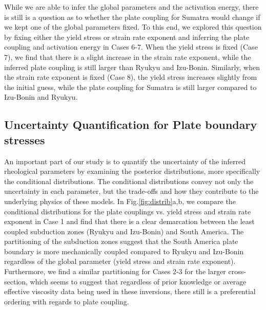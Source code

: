 \documentclass[12pt]{article}
\begin{document}
While we are able to infer the global parameters and the activation energy, there is still is a question as to whether the plate coupling for Sumatra would change if we kept one of the global parameters fixed. To this end, we explored this question by fixing either the yield stress or strain rate exponent and inferring the plate coupling and activation energy in Cases 6-7. When the yield stress is fixed (Case 7), we find that there is a slight increase in the strain rate exponent, while the inferred plate coupling is still larger than Ryukyu and Izu-Bonin. Similarly, when the strain rate exponent is fixed (Case 8), the yield stress increases slightly from the initial guess, while the plate coupling for Sumatra is still larger compared to Izu-Bonin and Ryukyu. 








\subsection{Uncertainty Quantification for Plate boundary stresses}

An important part of our study is to quantify the uncertainty of the inferred rheological parameters by examining the posterior distributions, more specifically the conditional distributions. The conditional distributions convey not only the uncertainty in each parameter, but the trade-offs and how they contribute to the underlying physics of these models. In Fig.\ref{fig:distrib}a,b, we compare the conditional distributions for the plate couplings vs. yield stress and strain rate exponent in Case 1 and find that there is a clear demarcation between the least coupled subduction zones (Ryukyu and Izu-Bonin) and South America. The partitioning of the subduction zones suggest that the South America plate boundary is more mechanically coupled compared to Ryukyu and Izu-Bonin regardless of the global parameter (yield stress and strain rate exponent). Furthermore, we find a similar partitioning for Cases 2-3 for the larger cross-section, which seems to suggest that regardless of prior knowledge or average effective viscosity data being used in these inversions, there still is a preferential ordering with regards to plate coupling. 
\end{document}
